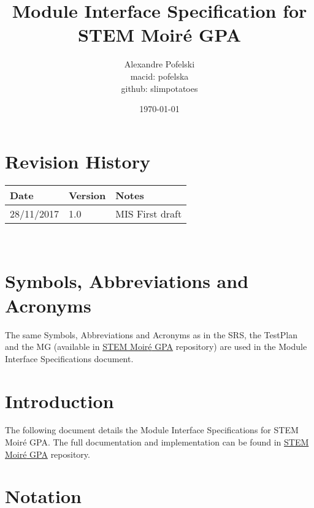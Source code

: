 \documentclass[12pt, titlepage]{article}
\newcommand{\progname}{STEM Moir{\'e} GPA}
\begin{document}
\title{Module Interface Specification for \progname{}}

\author{Alexandre Pofelski \\
		macid: pofelska \\
		github: slimpotatoes}

\date{\today}

\maketitle


\section{Revision History}

\begin{tabularx}{\textwidth}{p{3cm}p{2cm}X}
\toprule {\bf Date} & {\bf Version} & {\bf Notes}\\
\midrule
28/11/2017 & 1.0 & MIS First draft \\
\bottomrule
\end{tabularx}

~\newpage

\section{Symbols, Abbreviations and Acronyms}

The same Symbols, Abbreviations and Acronyms as in the SRS, the TestPlan and the 
MG (available in 
\href{https://github.com/slimpotatoes/STEM_Moire_GPA}{\progname{}} repository) 
are used in the Module Interface Specifications document. 

\newpage

\tableofcontents

\newpage


\section{Introduction}

The following document details the Module Interface Specifications for 
\progname{}. The full documentation and implementation can be found in 
\href{https://github.com/slimpotatoes/STEM_Moire_GPA}{\progname{}} repository.

\section{Notation}
\end{document}

